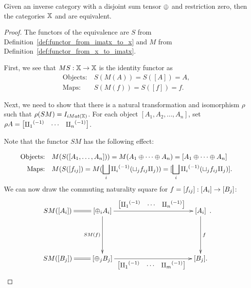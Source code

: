 \begin{proposition}\label{pro:x_and_imatx_are_equivalent}
  Given an inverse category \X with a disjoint sum tensor $\oplus$ and restriction zero, then the
  categories $\mathbb{X}$ and \imatx are equivalent.
\end{proposition}
\begin{proof}
  The functors of the equivalence are $S$ from Definition~\ref{def:functor_from_imatx_to_x} and
  $M$ from Definition~\ref{def:functor_from_x_to_imatx}.

  First, we see that $M S:\mathbb{X} \to \mathbb{X}$ is the identity functor as
  \begin{align*}
    \text{Objects:}\ &S(M(A)) = S([A]) = A,\\
    \text{Maps:}\ &S(M(f)) = S([f]) = f.
  \end{align*}

  Next, we need to show that there is a natural transformation and isomorphism $\rho$ such that
  $\rho(S M) = I_{iMat({\mathbb{X}})}$. For each object $[A_1,A_2,\ldots,A_n]$, set
  $\rho A = \begin{bmatrix}{\amalg_{1}}^{(-1)}& \cdots &{\amalg_{n}}^{(-1)}\end{bmatrix}$.

  Note that the functor $S M$ has the following effect:

  \begin{align*}
    \text{Objects:}\quad &M(S([A_1,\ldots, A_n])) = M(A_1\oplus\cdots\oplus A_n) =
      [A_1\oplus\cdots\oplus A_n]\\
    \text{Maps:}\quad &M(S([f_{ij}]) = M(\bigsqcup_i {\amalg_{i}}^{(-1)} (\sqcup_j f_{ij} \amalg_{j}))
      = [\bigsqcup_i {\amalg_{i}}^{(-1)} (\sqcup_j f_{ij} \amalg_{j})].
  \end{align*}
  We can now draw the commuting naturality square for $f=[f_{ij}]:[A_i]\to [B_j]$:
  \[
    \xymatrix{
      SM([A_i]) \ar@{=}[r] & [\+_i A_i]
          \ar[rrrr]^{\begin{bmatrix}\icpa& \cdots &\icp{n}\end{bmatrix}}
          \ar[dd]_{SM(f)}
          & &&& [A_i] \ar[dd]^{f}\\
        &&&&&  \\
      SM([B_j]) \ar@{=}[r] & [\+_j B_j]
          \ar[rrrr]_{\begin{bmatrix}\icpa& \cdots &\icp{m}\end{bmatrix}}
          & &&& [B_j]. \\
    }.
  \]


\end{proof}
